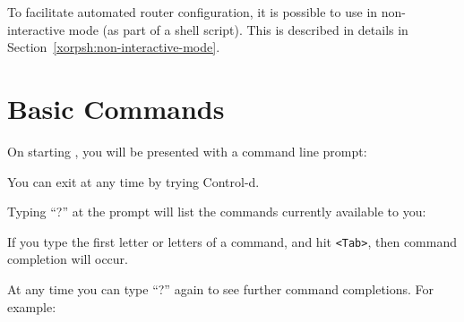 To facilitate automated \xorp router configuration, it is possible to use
\xorpsh in non-interactive mode (\eg as part of a shell script).
This is described in details in Section~\ref{xorpsh:non-interactive-mode}.

\newpage
\section{Basic Commands}

On starting \xorpsh, you will be presented with a command line prompt:
\vspace{0.1in}

\noindent{}
\vspace{0.1in}

\noindent
You can exit \xorpsh at any time by trying Control-d.

\noindent
Typing ``?'' at the prompt will list the commands currently available to
you:
\vspace{0.1in}

\noindent{}
\vspace{0.1in}

\noindent
If you type the first letter or letters of a command, and hit
{\tt <Tab>}, then command completion will occur.

\noindent
At any time you can type ``?'' again to see further 
command completions.  For
example:
\vspace{0.1in}

\noindent{}
\vspace{0.1in}

